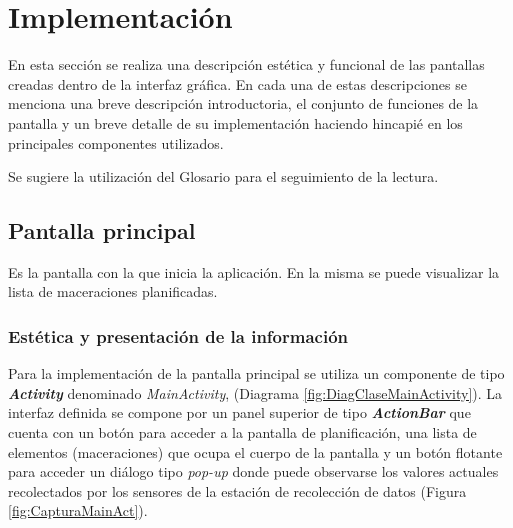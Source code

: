 \section{Implementación}
    \par En esta sección se realiza una descripción estética y funcional de las pantallas creadas dentro de la interfaz gráfica. En cada una de estas descripciones se menciona una breve descripción introductoria, el conjunto de funciones de la pantalla y un breve detalle de su implementación haciendo hincapié en los principales componentes utilizados.
    
    \par Se sugiere la utilización del Glosario para el seguimiento de la lectura.
     
    \subsection{Pantalla principal}
        \label{DescripPantallaPrincipal}
            \par Es la pantalla con la que inicia la aplicación. En la misma se puede visualizar la lista de maceraciones planificadas.
           
            \subsubsection{Estética y presentación de la información}
                \par Para la implementación de la pantalla principal se utiliza un componente de tipo \textbf{\textit{\gls{Activity}}}  denominado \textit{MainActivity}, (Diagrama \ref{fig:DiagClaseMainActivity}). La interfaz definida se compone por un panel superior de tipo \textbf{\textit{\gls{ActionBar}}} que cuenta con un botón para acceder a la pantalla de planificación, una lista de elementos (maceraciones) que ocupa el cuerpo de la pantalla y un botón flotante para acceder un diálogo tipo \textit{pop-up} donde puede observarse los valores actuales recolectados por los sensores de la estación de recolección de datos (Figura \ref{fig:CapturaMainAct}). 
                
